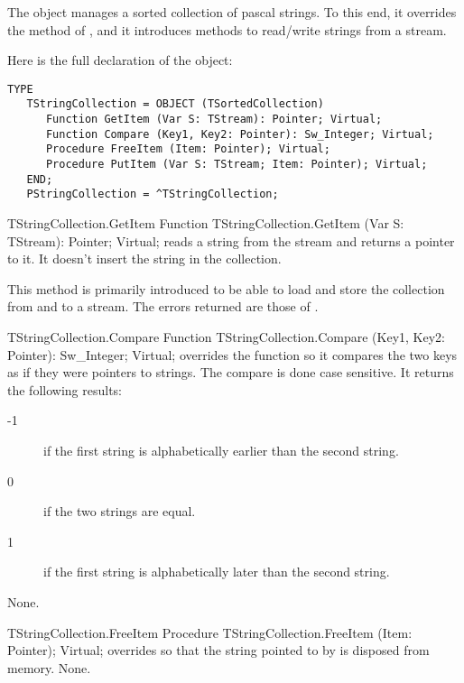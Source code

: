 The  object manages a sorted collection of pascal 
strings. 
To this end, it overrides the 
method of , and it introduces methods to read/write
strings from a stream.

Here is the full declaration of the  object:
\begin{verbatim}
TYPE
   TStringCollection = OBJECT (TSortedCollection)
      Function GetItem (Var S: TStream): Pointer; Virtual;
      Function Compare (Key1, Key2: Pointer): Sw_Integer; Virtual;
      Procedure FreeItem (Item: Pointer); Virtual;
      Procedure PutItem (Var S: TStream; Item: Pointer); Virtual;
   END;
   PStringCollection = ^TStringCollection;
\end{verbatim}

\begin{function}{TStringCollection.GetItem}
\Declaration
Function TStringCollection.GetItem (Var S: TStream): Pointer; Virtual;
\Description
{} reads a string from the stream  and returns a pointer 
to it. It doesn't insert the string in the collection.

This method is primarily introduced to be able to load and store the
collection from and to a stream.
\Errors
The errors returned are those of .
\SeeAlso
{}
\end{function}

\begin{function}{TStringCollection.Compare}
\Declaration
Function TStringCollection.Compare (Key1, Key2: Pointer): Sw\_Integer; Virtual;
\Description
{} overrides the  function so it compares 
the two keys as if they were pointers to strings. The compare is done case
sensitive. It returns the following results:
\begin{description}
\item[-1] if the first string is alphabetically earlier  than the second
string.
\item[0] if the two strings are equal.
\item[1] if the first string is alphabetically later than the second string.
\end{description}
\Errors
None.
\SeeAlso
{}
\end{function}



\begin{procedure}{TStringCollection.FreeItem}
\Declaration
Procedure TStringCollection.FreeItem (Item: Pointer); Virtual;
\Description
{} overrides  so that the string pointed
to by  is disposed from memory.
\Errors
None.
\SeeAlso
{}
\end{procedure}

